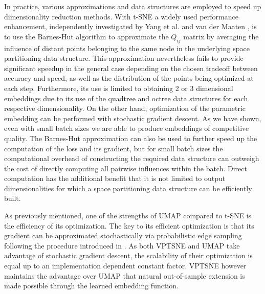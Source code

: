 In practice, various approximations and data structures are employed to speed up dimensionality reduction methods. With t-SNE a widely used performance enhancement, independently investigated by Yang et al. \cite{accelerated_tsne_1} and van der Maaten \cite{accelerated_tsne_2}, is to use the Barnes-Hut algorithm \cite{barnes_hut} to approximate the $Q_{ij}$ matrix by averaging the influence of distant points belonging to the same node in the underlying space partitioning data structure. This approximation nevertheless fails to provide significant speedup in the general case depending on the chosen tradeoff between accuracy and speed, as well as the distribution of the points being optimized at each step. Furthermore, its use is limited to obtaining 2 or 3 dimensional embeddings due to its use of the quadtree and octree data structures for each respective dimensionality. On the other hand, optimization of the parametric embedding can be performed with stochastic gradient descent. As we have shown, even with small batch sizes we are able to produce embeddings of competitive quality. The Barnes-Hut approximation can also be used to further speed up the computation of the loss and its gradient, but for small batch sizes the computational overhead of constructing the required data structure can outweigh the cost of directly computing all pairwise influences within the batch. Direct computation has the additional benefit that it is not limited to output dimensionalities for which a space partitioning data structure can be efficiently built.

As previously mentioned, one of the strengths of UMAP compared to t-SNE is the efficiency of its optimization. The key to its efficient optimization is that its gradient can be approximated stochastically via probabilistic edge sampling following the procedure introduced in \cite{largevis}. As both VPTSNE and UMAP take advantage of stochastic gradient descent, the scalability of their optimization is equal up to an implementation dependent constant factor. VPTSNE however maintains the advantage over UMAP that natural out-of-sample extension is made possible through the learned embedding function.

